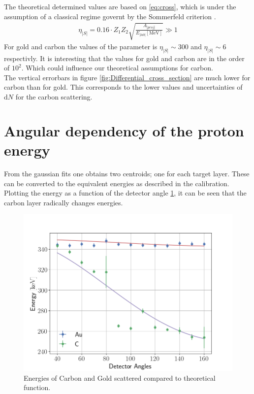 The theoretical determined values are based on \cref{eq:cross}, which is under the assumption of a classical regime governt by the Sommerfeld criterion \parencite[p. 14]{noteBB}.
\begin{align}\label{eq:som}
\eta_|S|=0.16\cdot Z_1Z_2\sqrt{\frac{A_|proj|}{E_|lab|[\si{\mega\electronvolt}]}}\gg 1
\end{align}
For gold and carbon the values of the parameter is $\eta_|S|\sim 300$ and
$\eta_|S|\sim 6$ respectivly. It is interesting that the values for gold and carbon are in the order of $10^2$. Which could influence our theoretical assumptions for carbon.   \\

The vertical errorbars in figure \cref{fig:Differential_cross_section} are much lower for carbon than for gold. This corresponds to the lower values and uncertainties of $\mathrm{d}N$ for the carbon scattering. 

\section{Angular dependency of the proton energy}
From the gaussian fits one obtains two centroids; one for each target layer. These can be converted to the equivalent energies as described in the calibration. Plotting the energy as a function of the detector angle \cref{fig_energy}, it can be seen that the carbon layer radically changes energies.\\
\begin{figure}[h!]
\centering
\includegraphics[width=0.99\columnwidth]{fig_energy}
\caption{Energies of Carbon and Gold scattered compared to theoretical
function.}
\label{fig_energy}
\end{figure}

